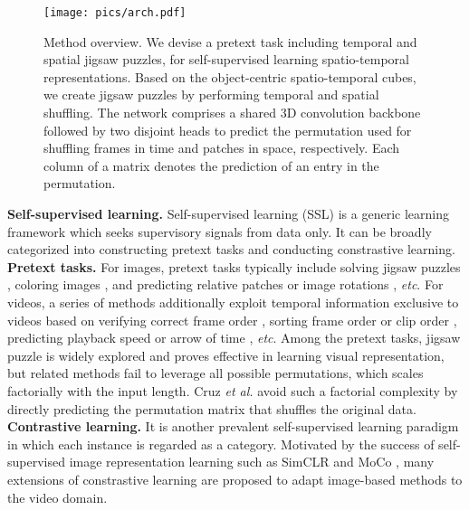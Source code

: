 \documentclass[runningheads]{llncs}
\begin{document}
\begin{figure*}[!h]
	\centering
	\texttt{[image: pics/arch.pdf]}
	\caption{Method overview. We devise a pretext task including temporal and spatial jigsaw puzzles, for self-supervised learning spatio-temporal representations. Based on the object-centric spatio-temporal cubes, we create jigsaw puzzles by performing temporal and spatial shuffling. The network comprises a shared 3D convolution backbone followed by two disjoint heads to predict the permutation used for shuffling frames in time and patches in space, respectively. Each column of a matrix denotes the prediction of an entry in the permutation.}
	\label{fig:overall_arch}
\end{figure*}


\textbf{Self-supervised learning.} Self-supervised learning (SSL) is a generic learning framework which seeks supervisory signals from data only. It can be broadly categorized into constructing pretext tasks and conducting constrastive learning. \textbf{Pretext tasks.} For images, pretext tasks typically include solving jigsaw puzzles \cite{noroozi2016unsupervised}, coloring images \cite{zhang2016colorful}, and predicting relative patches \cite{doersch2015unsupervised} or image rotations \cite{gidaris2018unsupervised}, \emph{etc}. For videos, a series of methods additionally exploit temporal information exclusive to videos based on verifying correct frame order \cite{misra2016shuffle}, sorting frame order \cite{lee2017unsupervised} or clip order \cite{xu2019self}, predicting playback speed \cite{benaim2020speednet} or arrow of time \cite{wei2018learning, pickup2014seeing}, \emph{etc}. Among the pretext tasks, jigsaw puzzle is widely explored and proves effective in learning visual representation, but related methods fail to leverage all possible permutations, which scales factorially with the input length. Cruz \emph{et al.} \cite{santa2018visual} avoid such a factorial complexity by directly predicting the permutation matrix that shuffles the original data. \textbf{Contrastive learning.} It is another prevalent self-supervised learning paradigm in which each instance is regarded as a category. Motivated by the success of self-supervised image representation learning such as SimCLR \cite{chen2020simple} and MoCo \cite{he2020momentum}, many extensions \cite{pan2021videomoco, lorre2020temporal} of constrastive learning are proposed to adapt image-based methods to the video domain. 
\end{document}
